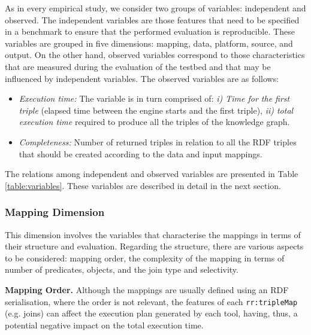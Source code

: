 As in every empirical study, we consider two groups of variables: independent and observed. The independent variables are those features that need to be specified in a benchmark to ensure that the performed evaluation is reproducible. These variables are grouped in five dimensions: mapping, data, platform, source, and output.
On the other hand, observed variables correspond to those characteristics that are measured during the evaluation of the testbed and that may be influenced by independent variables. The observed variables are as follows:
\begin{itemize}
    \item \textit{Execution time:} The variable is in turn comprised of: \textit{i) Time for the first triple} (elapsed time between the engine starts and the first triple), \textit{ii) total execution time} required to produce all the triples of the knowledge graph.
    \item \textit{Completeness:} Number of returned triples in relation to all the RDF triples that should be created according to the data and input mappings.
\end{itemize}
The relations among independent and observed variables are presented in Table \ref{table:variables}. These variables are described in detail in the next section. 


\subsubsection{Mapping Dimension}
This dimension involves the variables that characterise the mappings in terms of their structure and evaluation. Regarding the structure, there are various aspects to be considered: mapping order, the complexity of the mapping in terms of number of predicates, objects, and the join type and selectivity.

\noindent \textbf{Mapping Order.} Although the mappings are usually defined using an RDF serialisation, where the order is not relevant, the features of each \texttt{rr:tripleMap} (e.g. joins) can affect the execution plan generated by each tool, having, thus, a potential negative impact on the total execution time.


